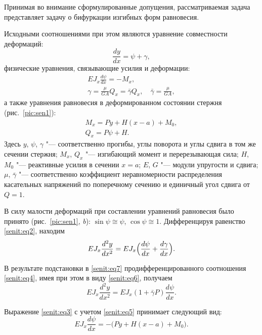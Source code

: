Принимая во внимание сформулированные допущения, рассматриваемая задача представляет задачу о бифуркации изгибных форм равновесия.

Исходными соотношениями при этом являются уравнение совместности деформаций:
\begin{equation}
\label{senit:eq2}
\frac{dy}{dx}=\psi +\gamma,
\end{equation}
физические уравнения, связывающие усилия и деформации:
\begin{gather}
\label{senit:eq3}
E J_x \frac{d\psi }{dx}=-M_x,\\
\label{senit:eq4}
\gamma =\frac{\mu }{GA}Q_x =\bar{\gamma}Q_x,
\quad
\bar{\gamma} =\frac{\mu }{GA},
\end{gather}
а также уравнения равновесия в деформированном состоянии стержня (рис.~\ref{pic:sen1}):
\begin{gather}
\label{senit:eq5}
M_x =Py+H(x-a)+M_0,\\
\label{senit:eq6}
Q_x =P \psi +H.
\end{gather}
Здесь $y$, $\psi$, $\gamma$ "--- соответственно прогибы, углы поворота и углы сдвига в том же сечении стержня;
$M_x$, $Q_x$ "--- изгибающий момент и перерезывающая сила;
$H$, $M_0$ "--- реактивные усилия в сечении $x=a$;
$E$, $G$ "--- модули упругости и сдвига;
$\mu$, $\bar{\gamma}$ "--- соответственно коэффициент неравномерности распределения касательных напряжений по  поперечному сечению и единичный угол сдвига от $Q=1$.

В силу малости деформаций при составлении уравнений равновесия было принято
(рис.~\ref{pic:sen1}, {\sl b}):
$\sin \psi \cong \psi$, $\cos \psi \cong 1$.
Дифференцируя равенство \eqref{senit:eq2}, находим
\begin{equation}
\label{senit:eq7}
EJ_x \frac{d^2y}{dx^2}=EJ_x \Bigl(\frac{d\psi }{dx}+\frac{d\gamma }{dx} \Bigr).
\end{equation}

В результате подстановки в \eqref{senit:eq7} продифференцированного соотношения \eqref{senit:eq4},
имея при этом в виду \eqref{senit:eq6}, получаем
\begin{equation}
\label{senit:eq8}
EJ_x \frac{d^2y}{dx^2}=EJ_x \left(1+\bar{\gamma}P \right)\frac{d\psi}{dx}.
\end{equation}

Выражение \eqref{senit:eq3} с учетом \eqref{senit:eq5} принимает следующий вид:
\begin{equation}
\label{senit:eq9}
EJ_x \frac{d\psi }{dx}=-\bigl(Py+H(x-a)+M_0\bigr).
\end{equation}

